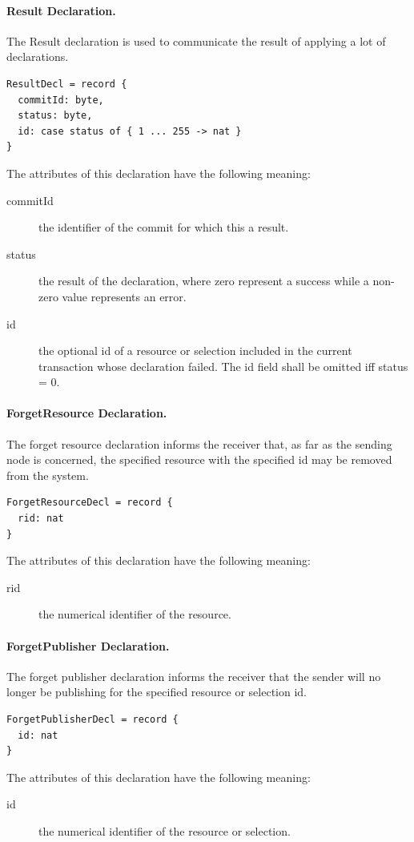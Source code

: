 \documentclass[a4paper,oneside,article]{memoir}
\begin{document}
\paragraph{Result Declaration.} The Result declaration is used to communicate the result of
applying a lot of declarations.
\begin{verbatim}
ResultDecl = record {
  commitId: byte,
  status: byte,
  id: case status of { 1 ... 255 -> nat }
}
\end{verbatim}
The attributes of this declaration have the following meaning:
\begin{description}
\item[commitId] the identifier of the commit for which this a result.
\item[status] the result of the declaration, where zero represent a success while a non-zero value
  represents an error.
\item[id] the optional id of a resource or selection included in the current transaction whose
  declaration failed.  The id field shall be omitted iff status = 0.
\end{description}

\paragraph{ForgetResource Declaration.} The forget resource declaration informs the receiver that,
as far as the sending node is concerned, the specified resource with the specified id may be removed
from the system.
\begin{verbatim}
ForgetResourceDecl = record {
  rid: nat
}
\end{verbatim}
The attributes of this declaration have the following meaning:
\begin{description}
\item[rid] the numerical identifier of the resource.
\end{description}

\paragraph{ForgetPublisher Declaration.} The forget publisher declaration informs the receiver that
the sender will no longer be publishing for the specified resource or selection id.
\begin{verbatim}
ForgetPublisherDecl = record {
  id: nat
}
\end{verbatim}
The attributes of this declaration have the following meaning:
\begin{description}
\item[id] the numerical identifier of the resource or selection.
\end{description}
\end{document}
